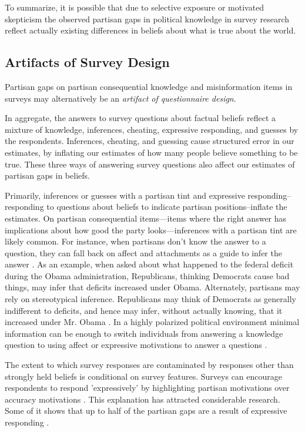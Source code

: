\documentclass[12pt, letterpaper]{article}
\begin{document}
To summarize, it is possible that due to selective exposure or motivated skepticism the observed partisan gaps in political knowledge in survey research reflect actually existing differences in beliefs about what is true about the world.

\subsection*{Artifacts of Survey Design}
Partisan gaps on partisan consequential knowledge and misinformation items in surveys may alternatively be an \emph{artifact of questionnaire design}.

In aggregate, the answers to survey questions about factual beliefs reflect a mixture of knowledge, inferences, cheating, expressive responding, and guesses by the respondents. Inferences, cheating, and guessing cause structured error in our estimates, by inflating our estimates of how many people believe something to be true. These three ways of answering survey questions also affect our estimates of partisan gaps in beliefs.

Primarily, inferences or guesses with a partisan tint and expressive responding--responding to questions about beliefs to indicate partisan positions--inflate the estimates. On partisan consequential items---items where the right answer has implications about how good the party looks---inferences with a partisan tint are likely common. For instance, when partisans don't know the answer to a question, they can fall back on affect and attachments as a guide to infer the answer \citep{malka2022expressive}. As an example, when asked about what happened to the federal deficit during the Obama administration, Republicans, thinking Democrats cause bad things, may infer that deficits increased under Obama. Alternately, partisans may rely on stereotypical inference. Republicans may think of Democrats as generally indifferent to deficits, and hence may infer, without actually knowing, that it increased under Mr. Obama \citep[e.g.][]{rahn1993role, goggin2020goes}. In a highly polarized political environment minimal information can be enough to switch individuals from answering a knowledge question to using affect or expressive motivations to answer a questions \citep{klar2014partisanship, merkley2018party}.

The extent to which survey responses are contaminated by responses other than strongly held beliefs is conditional on survey features. Surveys can encourage respondents to respond 'expressively' by highlighting partisan motivations over accuracy motivations \citep{Zaller1992, petersen2013motivated, klar2014partisanship}. This explanation has attracted considerable research. Some of it shows that up to half of the partisan gaps are a result of expressive responding \citep[][though see \citeauthor{berinsky_2017} \citeyear{berinsky_2017}]{bullocketal_2015,huber_yair_2018, prior2015you}.
\end{document}
